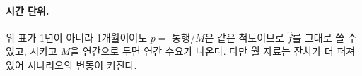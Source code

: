 \documentclass[10pt,a4paper]{article}
\begin{document}
\paragraph{시간 단위.} 위 표가 1년이 아니라 1개월이어도 $p=$ 통행$/M$은 같은 척도이므로 $\hat f$를 그대로 쓸 수 있고, 시카고 $M$을 연간으로 두면 연간 수요가 나온다. 다만 월 자료는 잔차가 더 퍼져 있어 시나리오의 변동이 커진다.

\end{document}
